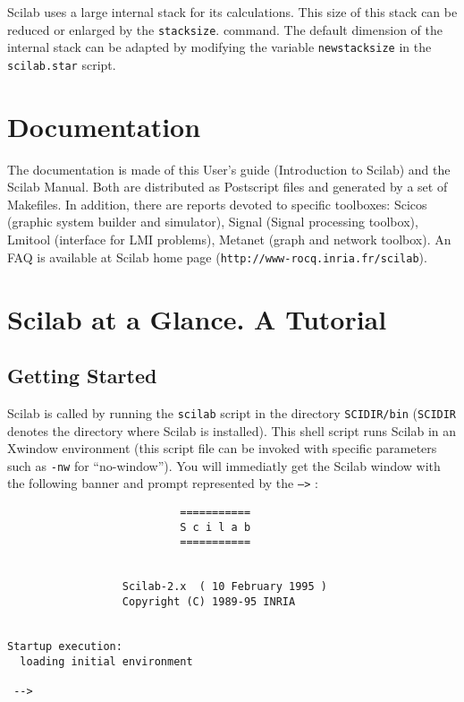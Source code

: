 \label{stks}
Scilab uses a large internal stack for its calculations. This size
of this stack can be reduced or enlarged by the 
{\tt stacksize}.
command. The default dimension of the internal stack can be adapted
by modifying the variable {\tt newstacksize} in the {\tt scilab.star}
script.

\section{Documentation}

The documentation is made of this User's guide (Introduction to
Scilab) and the Scilab Manual. Both are distributed as Postscript
files and generated by a set of Makefiles. In addition, there are
reports devoted to specific toolboxes: Scicos (graphic system builder
and simulator), Signal (Signal processing toolbox), Lmitool (interface for 
LMI problems), Metanet (graph and network toolbox). An FAQ is
available at Scilab home page 
(\verb!http://www-rocq.inria.fr/scilab!).

\section{Scilab at a Glance. A Tutorial}

\subsection{Getting Started}

Scilab is called by running the {\tt scilab} script in the 
directory {\tt SCIDIR/bin} ({\tt SCIDIR} denotes the directory 
where Scilab is installed).
This shell script  runs Scilab in an Xwindow environment (this 
script file can be invoked with
specific parameters such as \verb!-nw! for ``no-window'').
You will immediatly get the Scilab window with the following banner and 
prompt represented by the {\tt -->} : 


\bigskip

\begin{verbatim}
                           ===========
                           S c i l a b
                           ===========
 
 
                  Scilab-2.x  ( 10 February 1995 ) 
                  Copyright (C) 1989-95 INRIA 
 
 
Startup execution:
  loading initial environment
   
 -->

\end{verbatim}


